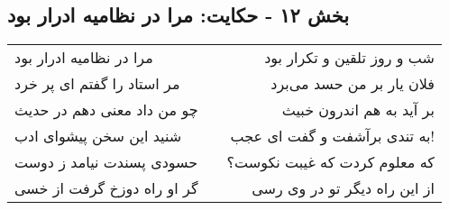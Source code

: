 \begin{center}
\section*{بخش ۱۲ - حکایت: مرا در نظامیه ادرار بود}
\label{sec:012}
\begin{longtable}{l p{0.5cm} r}
مرا در نظامیه ادرار بود
&&
شب و روز تلقین و تکرار بود
\\
مر استاد را گفتم ای پر خرد
&&
فلان یار بر من حسد می‌برد
\\
چو من داد معنی دهم در حدیث
&&
بر آید به هم اندرون خبیث
\\
شنید این سخن پیشوای ادب
&&
به تندی برآشفت و گفت ای عجب!
\\
حسودی پسندت نیامد ز دوست
&&
که معلوم کردت که غیبت نکوست؟
\\
گر او راه دوزخ گرفت از خسی
&&
از این راه دیگر تو در وی رسی
\\
\end{longtable}
\end{center}

